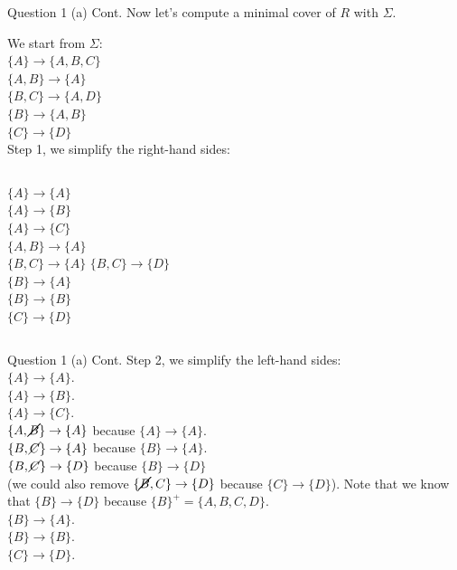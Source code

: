 \begin{frame}[fragile]{Question 1 (a) Cont.}
	Now let's compute a minimal cover of $R$ with $\Sigma$.\vspace{10pt}
	
	We start from $\Sigma$: \\\vspace{5pt}
	$\{A\} \rightarrow \{A, B, C\}$\\
	$\{A, B\} \rightarrow \{A\}$\\
	$\{B, C\} \rightarrow \{A, D\}$\\
	$\{B\} \rightarrow \{A, B\}$\\
	$\{C\} \rightarrow \{D\}$\\\vspace{5pt}
	Step 1, we simplify the right-hand sides:\\\vspace{3pt}
	\begin{columns}[t]
	$\{A\} \rightarrow \{A\}$\\
	$\{A\} \rightarrow \{B\}$\\
	$\{A\} \rightarrow \{C\}$\\
	$\{A, B\} \rightarrow \{A\}$\\
	$\{B, C\} \rightarrow \{A\}$
	$\{B, C\} \rightarrow \{D\}$\\
	$\{B\} \rightarrow \{A\}$\\
	$\{B\} \rightarrow \{B\}$\\
	$\{C\} \rightarrow \{D\}$
	\end{columns}
\end{frame}

\begin{frame}[fragile]{Question 1 (a) Cont.}
	Step 2, we simplify the left-hand sides:\\\vspace{3pt}
	$\{A\} \rightarrow \{A\}$.\\	
	$\{A\} \rightarrow \{B\}$.\\	
	$\{A\} \rightarrow \{C\}$.\\	
	$\{A,\cancel{B}\} \rightarrow \{A\}$ because $\{A\} \rightarrow \{A\}$.\\	
	$\{B, \cancel{C}\} \rightarrow \{A\}$ because $\{B\} \rightarrow \{A\}$.\\	
	$\{B, \cancel{C}\} \rightarrow \{D\}$ because $\{B\} \rightarrow \{D\}$ \\\vspace{3pt}
	(we could also remove $\{\cancel{B}, C\} \rightarrow \{D\}$ because $\{C\} \rightarrow \{D\}$). Note that we know that $\{B\} \rightarrow \{D\}$ because $\{B\}^{+}= \{A, B, C, D\}$.\\\vspace{3pt}
	$\{B\} \rightarrow \{A\}$.\\
	$\{B\} \rightarrow \{B\}$.\\
	$\{C\} \rightarrow \{D\}$.
\end{frame}

